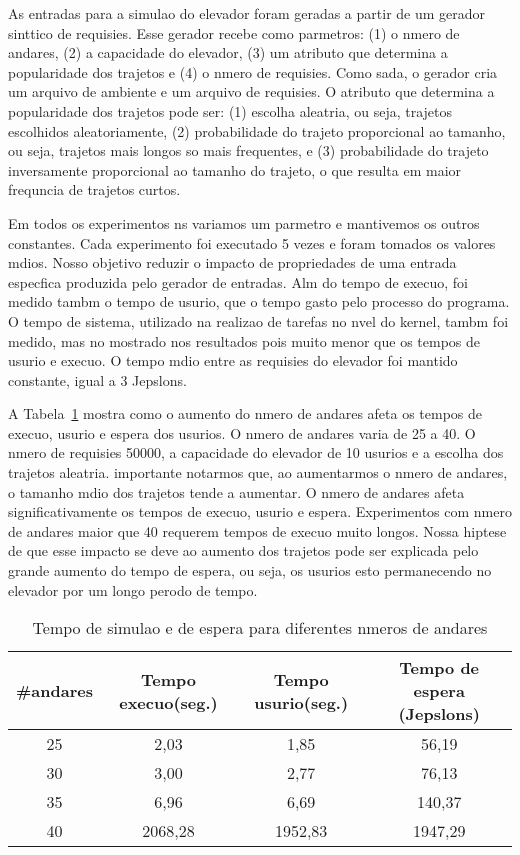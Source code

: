 \documentclass[12pt]{article}
\begin{document}
As entradas para a simulao do elevador foram geradas a partir de um gerador sinttico de requisies. Esse gerador recebe como parmetros: (1) o nmero de andares, (2) a capacidade do elevador, (3) um atributo que determina a popularidade dos trajetos e (4) o nmero de requisies. Como sada, o gerador cria um arquivo de ambiente e um arquivo de requisies. O atributo que determina a popularidade dos trajetos pode ser: (1) escolha aleatria, ou seja, trajetos escolhidos aleatoriamente, (2) probabilidade do trajeto proporcional ao tamanho, ou seja, trajetos mais longos so mais frequentes, e (3) probabilidade do trajeto inversamente proporcional ao tamanho do trajeto, o que resulta em maior frequncia de trajetos curtos.

Em todos os experimentos ns variamos um parmetro e mantivemos os outros constantes. Cada experimento foi executado 5 vezes e foram tomados os valores mdios. Nosso objetivo  reduzir o impacto de propriedades de uma entrada especfica produzida pelo gerador de entradas.  Alm do tempo de execuo, foi medido tambm o tempo de usurio, que  o tempo gasto pelo processo do programa. O tempo de sistema, utilizado na realizao de tarefas no nvel do kernel, tambm foi medido, mas no  mostrado nos resultados pois  muito menor que os tempos de usurio e execuo. O tempo mdio entre as requisies do elevador foi mantido constante, igual a 3 Jepslons.

A Tabela~\ref{tempo_n_andares} mostra como o aumento do nmero de andares afeta os tempos de  execuo, usurio e espera dos usurios. O nmero de andares varia de 25 a 40. O nmero de requisies  50000, a capacidade do elevador  de 10 usurios e a escolha dos trajetos  aleatria.  importante notarmos que, ao aumentarmos o nmero de andares, o tamanho mdio dos trajetos tende a aumentar. O nmero de andares afeta significativamente os tempos de execuo, usurio e espera. Experimentos com nmero de andares maior que 40 requerem tempos de execuo muito longos. Nossa hiptese de que esse impacto se deve ao aumento dos trajetos pode ser explicada pelo grande aumento do tempo de espera, ou seja, os usurios esto permanecendo no elevador por um longo perodo de tempo.

\begin{table}[ht!]
\centering
\begin{footnotesize}
\begin{tabular}{|c|c|c|c|}
\hline
\textbf{\#andares}              		& \textbf{Tempo execuo(seg.)} & \textbf{Tempo usurio(seg.)}      & \textbf{Tempo de espera (Jepslons)}\\ \hline
25	& 2,03		& 1,85		& 56,19\\ \hline
30	& 3,00		& 2,77		& 76,13\\ \hline
35	& 6,96		& 6,69		& 140,37\\ \hline
40	& 2068,28	& 1952,83	& 1947,29\\ \hline
\end{tabular}
\end{footnotesize}
\caption{Tempo de simulao e de espera para diferentes nmeros de andares \label{tempo_n_andares}}
\end{table}
\end{document}
